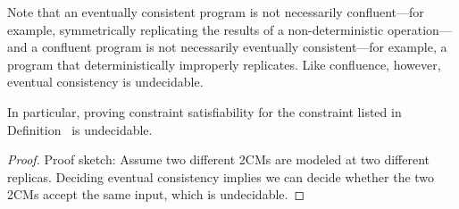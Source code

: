
Note that an eventually consistent program is not necessarily confluent---for example, symmetrically replicating the results of a non-deterministic operation---and a confluent program is not necessarily eventually consistent---for example, a program that deterministically improperly replicates.  Like confluence, however, eventual consistency is undecidable.



\begin{lemma}
In particular, proving constraint satisfiability for the constraint listed in Definition~\label{def:ec} is undecidable.
\end{lemma}
\begin{proof}
Proof sketch: Assume two different 2CMs are modeled at two different replicas.  Deciding eventual consistency implies we can decide whether the two 2CMs accept the same input, which is undecidable.
\end{proof}


%


